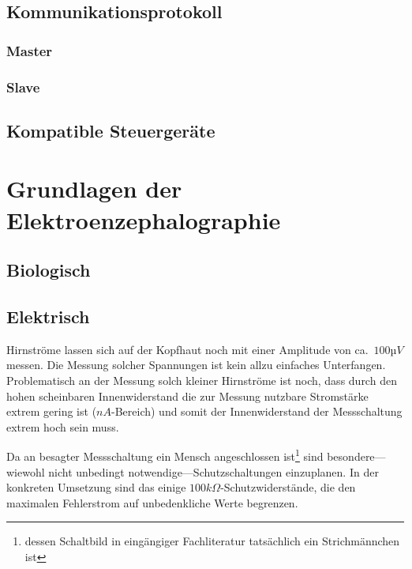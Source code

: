\documentclass[12pt,a4paper,notitlepage]{article}
\begin{document}
\subsection{Kommunikationsprotokoll}
\subsubsection{Master}
\subsubsection{Slave}
\subsection{Kompatible Steuergeräte}
\section{Grundlagen der Elektroenzephalographie}
\subsection{Biologisch}
\subsection{Elektrisch}
Hirnströme lassen sich auf der Kopfhaut noch mit einer Amplitude von ca.\ $100µV$ messen. Die Messung solcher Spannungen ist kein allzu einfaches Unterfangen. Problematisch an der Messung solch kleiner Hirnströme ist noch, dass durch den hohen scheinbaren Innenwiderstand die zur Messung nutzbare Stromstärke extrem gering ist ($nA$-Bereich) und somit der Innenwiderstand der Messschaltung extrem hoch sein muss.

Da an besagter Messschaltung ein Mensch angeschlossen ist\footnote{dessen Schaltbild in eingängiger Fachliteratur tatsächlich ein Strichmännchen ist} sind besondere---wiewohl nicht unbedingt notwendige---Schutzschaltungen einzuplanen. In der konkreten Umsetzung sind das einige $100k\Omega$-Schutzwiderstände, die den maximalen \gls{Fehlerstrom} auf unbedenkliche Werte begrenzen.
\end{document}
